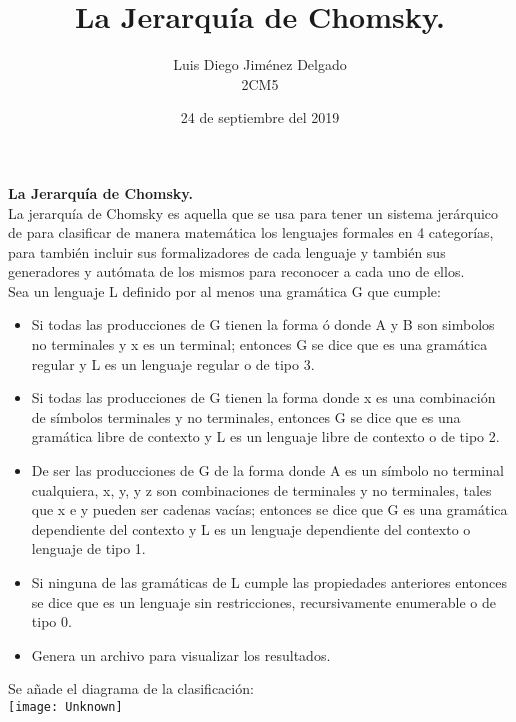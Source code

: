 \documentclass[12pt]{article}
\title{La Jerarquía de Chomsky.}
\author{Luis Diego Jiménez Delgado\\ 2CM5}
\date{24 de septiembre del 2019}
\begin{document}
\maketitle

\textbf{La Jerarquía de Chomsky.} \\
La jerarquía de Chomsky es aquella que se usa para tener un sistema jerárquico de para clasificar  de manera matemática los lenguajes formales en 4 categorías, para también incluir sus formalizadores de cada lenguaje y también sus generadores y autómata de los mismos para reconocer a cada uno de ellos. 
\\ Sea un lenguaje L definido por al menos una gramática G que cumple:
\\
    \begin{itemize}
        \item Si todas las producciones de G tienen la forma ó donde A y B son simbolos no terminales y x es un terminal; entonces G se dice que es una gramática regular y L es un lenguaje regular o de tipo 3.
        \item Si todas las producciones de G tienen la forma donde x es una combinación de símbolos terminales y no terminales, entonces G se dice que es una gramática libre de contexto y L es un lenguaje libre de contexto o de tipo 2.
        \item De ser las producciones de G de la forma donde A es un símbolo no terminal cualquiera, x, y, y z son combinaciones de terminales y no terminales, tales que x e y pueden ser cadenas vacías; entonces se dice que G es una gramática dependiente del contexto y L es un lenguaje dependiente del contexto o lenguaje de tipo 1.
        \item Si ninguna de las gramáticas de L cumple las propiedades anteriores entonces se dice que es un lenguaje sin restricciones, recursivamente enumerable o de tipo 0.
        \item Genera un archivo para visualizar los resultados.
    \end{itemize}
Se añade el diagrama de la clasificación:\\
\texttt{[image: Unknown]}
\end{document}

